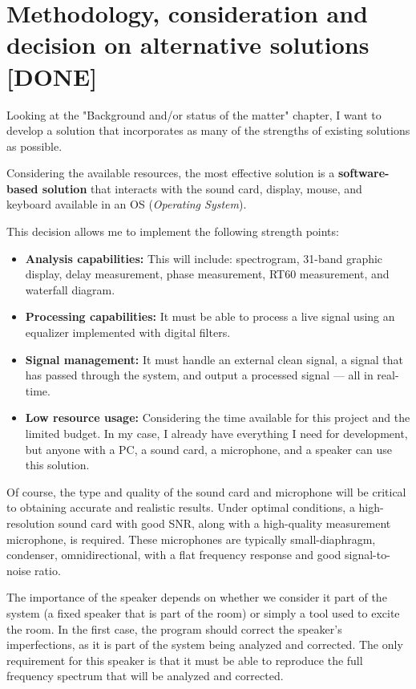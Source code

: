 \chapter{Methodology, consideration and decision on alternative solutions [DONE]}

Looking at the "Background and/or status of the matter" chapter, I want to develop a solution that incorporates as many of the strengths of existing solutions as possible.

Considering the available resources, the most effective solution is a \textbf{software-based solution} that interacts with the sound card, display, mouse, and keyboard available in an OS (\textit{Operating System}).

This decision allows me to implement the following strength points:

\begin{itemize}
	\item \textbf{Analysis capabilities:} This will include: spectrogram, 31-band graphic display, delay measurement, phase measurement, RT60 measurement, and waterfall diagram.
	
	\item \textbf{Processing capabilities:} It must be able to process a live signal using an equalizer implemented with digital filters.
	
	\item \textbf{Signal management:} It must handle an external clean signal, a signal that has passed through the system, and output a processed signal — all in real-time.
	
	\item \textbf{Low resource usage:} Considering the time available for this project and the limited budget. In my case, I already have everything I need for development, but anyone with a PC, a sound card, a microphone, and a speaker can use this solution.
\end{itemize}

Of course, the type and quality of the sound card and microphone will be critical to obtaining accurate and realistic results. Under optimal conditions, a high-resolution sound card with good SNR, along with a high-quality measurement microphone, is required. These microphones are typically small-diaphragm, condenser, omnidirectional, with a flat frequency response and good signal-to-noise ratio.

The importance of the speaker depends on whether we consider it part of the system (a fixed speaker that is part of the room) or simply a tool used to excite the room. In the first case, the program should correct the speaker's imperfections, as it is part of the system being analyzed and corrected. The only requirement for this speaker is that it must be able to reproduce the full frequency spectrum that will be analyzed and corrected.

